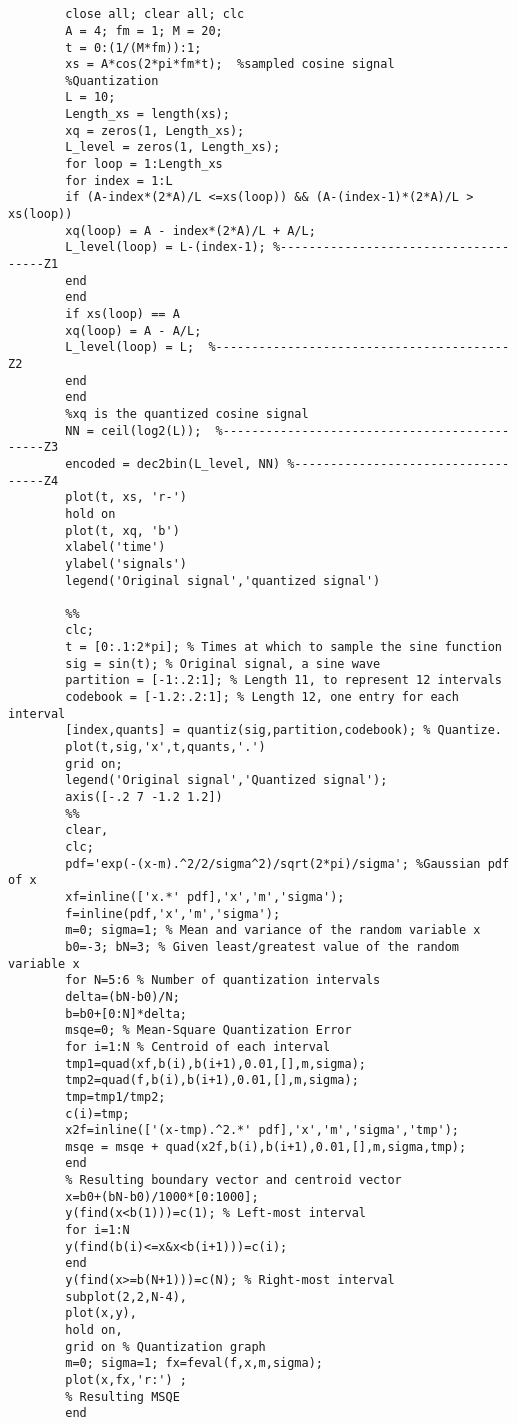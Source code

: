 \documentclass{book}
\author{علی}
\begin{document}
	\maketitle
	\tableofcontents
	\singlespacing
	\listoffigures
	\listoftables
	\Time
\chapter{}
\begin{latin}
	\begin{verbatim}
		close all; clear all; clc
		A = 4; fm = 1; M = 20;
		t = 0:(1/(M*fm)):1;
		xs = A*cos(2*pi*fm*t);  %sampled cosine signal
		%Quantization
		L = 10;
		Length_xs = length(xs);
		xq = zeros(1, Length_xs);
		L_level = zeros(1, Length_xs);
		for loop = 1:Length_xs
		for index = 1:L
		if (A-index*(2*A)/L <=xs(loop)) && (A-(index-1)*(2*A)/L > xs(loop)) 
		xq(loop) = A - index*(2*A)/L + A/L;
		L_level(loop) = L-(index-1); %-------------------------------------Z1
		end
		end
		if xs(loop) == A
		xq(loop) = A - A/L;
		L_level(loop) = L;  %-----------------------------------------Z2
		end
		end
		%xq is the quantized cosine signal
		NN = ceil(log2(L));  %---------------------------------------------Z3
		encoded = dec2bin(L_level, NN) %-----------------------------------Z4
		plot(t, xs, 'r-')
		hold on
		plot(t, xq, 'b')
		xlabel('time')
		ylabel('signals')
		legend('Original signal','quantized signal')
		
		%% 
		clc;
		t = [0:.1:2*pi]; % Times at which to sample the sine function
		sig = sin(t); % Original signal, a sine wave
		partition = [-1:.2:1]; % Length 11, to represent 12 intervals
		codebook = [-1.2:.2:1]; % Length 12, one entry for each interval
		[index,quants] = quantiz(sig,partition,codebook); % Quantize.
		plot(t,sig,'x',t,quants,'.')
		grid on;
		legend('Original signal','Quantized signal');
		axis([-.2 7 -1.2 1.2])
		%%
		clear,
		clc;
		pdf='exp(-(x-m).^2/2/sigma^2)/sqrt(2*pi)/sigma'; %Gaussian pdf of x
		xf=inline(['x.*' pdf],'x','m','sigma');
		f=inline(pdf,'x','m','sigma');
		m=0; sigma=1; % Mean and variance of the random variable x
		b0=-3; bN=3; % Given least/greatest value of the random variable x
		for N=5:6 % Number of quantization intervals
		delta=(bN-b0)/N; 
		b=b0+[0:N]*delta;
		msqe=0; % Mean-Square Quantization Error
		for i=1:N % Centroid of each interval
		tmp1=quad(xf,b(i),b(i+1),0.01,[],m,sigma);
		tmp2=quad(f,b(i),b(i+1),0.01,[],m,sigma);
		tmp=tmp1/tmp2;
		c(i)=tmp; 
		x2f=inline(['(x-tmp).^2.*' pdf],'x','m','sigma','tmp');
		msqe = msqe + quad(x2f,b(i),b(i+1),0.01,[],m,sigma,tmp); 
		end
		% Resulting boundary vector and centroid vector
		x=b0+(bN-b0)/1000*[0:1000];
		y(find(x<b(1)))=c(1); % Left-most interval
		for i=1:N
		y(find(b(i)<=x&x<b(i+1)))=c(i);
		end
		y(find(x>=b(N+1)))=c(N); % Right-most interval
		subplot(2,2,N-4), 
		plot(x,y),
		hold on,
		grid on % Quantization graph
		m=0; sigma=1; fx=feval(f,x,m,sigma);
		plot(x,fx,'r:') ;
		% Resulting MSQE
		end
	\end{verbatim}
\end{latin}
\end{document}
